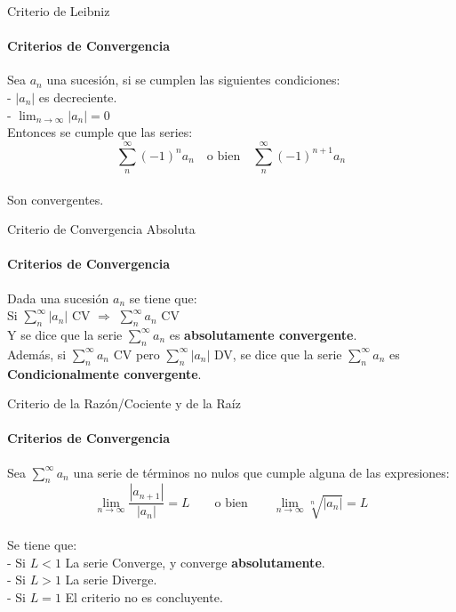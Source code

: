 \documentclass{plantillaPPT}
\begin{document}
\begin{frame}{Criterio de Leibniz}
\framesubtitle{Criterios de Convergencia}

Sea \(a_n\) una sucesión, si se cumplen las siguientes condiciones:\\[2ex]
- \(|a_n|\) es decreciente.\\[2ex]
- \(\displaystyle\lim_{n\to\infty}|a_n| = 0\)\\[2ex]
Entonces se cumple que las series:\\[2ex]
\[\sum_{n}^\infty (-1)^{n} a_n \quad \text{o bien} \quad \sum_{n}^\infty (-1)^{n+1} a_n\]\\[2ex]
Son convergentes.

\end{frame}

\begin{frame}{Criterio de Convergencia Absoluta}
\framesubtitle{Criterios de Convergencia}

Dada una sucesión \(a_n\) se tiene que:\\[2ex]
Si \(\displaystyle\sum_{n}^\infty |a_n|\) CV \(\Rightarrow\) \(\displaystyle\sum_{n}^\infty a_n\) CV\\[2ex]
Y se dice que la serie \(\displaystyle\sum_{n}^\infty a_n\) es \textbf{absolutamente convergente}.\\[4ex]
Además, si \(\displaystyle\sum_{n}^\infty a_n\) CV pero \(\displaystyle\sum_{n}^\infty |a_n|\) DV, se dice que la serie \(\displaystyle\sum_{n}^\infty a_n\) es \textbf{Condicionalmente convergente}.
\end{frame}

\begin{frame}{Criterio de la Razón/Cociente y de la Raíz}
\framesubtitle{Criterios de Convergencia}

Sea \(\displaystyle\sum_{n}^\infty a_n\) una serie de términos no nulos que cumple alguna de las expresiones:\\[2ex]

\[\lim_{n\to\infty}\frac{|a_{n+1}|}{|a_n|} = L \qquad \text{o bien} \qquad \lim_{n\to\infty}\sqrt[n]{|a_n|} = L\]\\[2ex]
Se tiene que:\\[2ex]
- Si \(L<1\) La serie Converge, y converge \textbf{absolutamente}. \\[2ex]
- Si \(L>1\) La serie Diverge.\\[2ex]
- Si \(L=1\) El criterio no es concluyente.
    
\end{frame}
\end{document}
